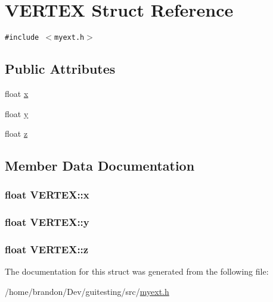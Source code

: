 \hypertarget{struct_v_e_r_t_e_x}{
\section{VERTEX Struct Reference}
\label{struct_v_e_r_t_e_x}
}
{\tt \#include $<$myext.h$>$}

\subsection*{Public Attributes}
\begin{CompactItemize}
\item 
float \hyperlink{struct_v_e_r_t_e_x_49987cf76b2b738e89d100bedf7ca21a}{x}
\item 
float \hyperlink{struct_v_e_r_t_e_x_bfe9878ceed7a687387eeee9ff0279ba}{y}
\item 
float \hyperlink{struct_v_e_r_t_e_x_d270a2dd1045d7e3480e74045d1266e6}{z}
\end{CompactItemize}


\subsection{Member Data Documentation}
\hypertarget{struct_v_e_r_t_e_x_49987cf76b2b738e89d100bedf7ca21a}{
\subsubsection[{x}]{\setlength{\rightskip}{0pt plus 5cm}float {\bf VERTEX::x}}}
\label{struct_v_e_r_t_e_x_49987cf76b2b738e89d100bedf7ca21a}


\hypertarget{struct_v_e_r_t_e_x_bfe9878ceed7a687387eeee9ff0279ba}{
\subsubsection[{y}]{\setlength{\rightskip}{0pt plus 5cm}float {\bf VERTEX::y}}}
\label{struct_v_e_r_t_e_x_bfe9878ceed7a687387eeee9ff0279ba}


\hypertarget{struct_v_e_r_t_e_x_d270a2dd1045d7e3480e74045d1266e6}{
\subsubsection[{z}]{\setlength{\rightskip}{0pt plus 5cm}float {\bf VERTEX::z}}}
\label{struct_v_e_r_t_e_x_d270a2dd1045d7e3480e74045d1266e6}




The documentation for this struct was generated from the following file:\begin{CompactItemize}
\item 
/home/brandon/Dev/guitesting/src/\hyperlink{myext_8h}{myext.h}\end{CompactItemize}
